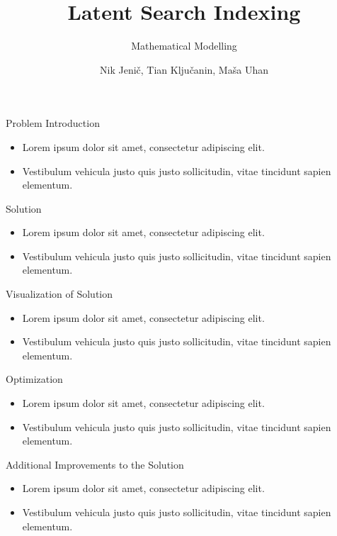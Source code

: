 \documentclass{beamer}
\title{Latent Search Indexing}
\subtitle{Mathematical Modelling}
\author{Nik Jenič, Tian Ključanin, Maša Uhan}
\date{}
\begin{document}
\frame{\titlepage}

\begin{frame}{Problem Introduction}
    \begin{itemize}
        \item Lorem ipsum dolor sit amet, consectetur adipiscing elit.
        \item Vestibulum vehicula justo quis justo sollicitudin, vitae tincidunt sapien elementum.
    \end{itemize}
\end{frame}

\begin{frame}{Solution}
    \begin{itemize}
        \item Lorem ipsum dolor sit amet, consectetur adipiscing elit.
        \item Vestibulum vehicula justo quis justo sollicitudin, vitae tincidunt sapien elementum.
    \end{itemize}
\end{frame}

\begin{frame}{Visualization of Solution}
    \begin{itemize}
        \item Lorem ipsum dolor sit amet, consectetur adipiscing elit.
        \item Vestibulum vehicula justo quis justo sollicitudin, vitae tincidunt sapien elementum.
    \end{itemize}
\end{frame}

\begin{frame}{Optimization}
    \begin{itemize}
        \item Lorem ipsum dolor sit amet, consectetur adipiscing elit.
        \item Vestibulum vehicula justo quis justo sollicitudin, vitae tincidunt sapien elementum.
    \end{itemize}
\end{frame}

\begin{frame}{Additional Improvements to the Solution}
    \begin{itemize}
        \item Lorem ipsum dolor sit amet, consectetur adipiscing elit.
        \item Vestibulum vehicula justo quis justo sollicitudin, vitae tincidunt sapien elementum.
    \end{itemize}
\end{frame}
\end{document}
